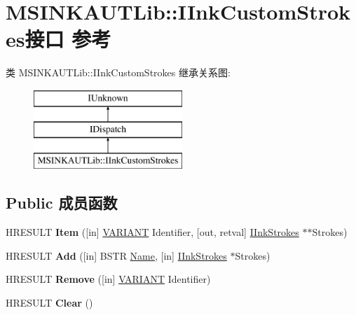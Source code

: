 \hypertarget{interface_m_s_i_n_k_a_u_t_lib_1_1_i_ink_custom_strokes}{}\section{M\+S\+I\+N\+K\+A\+U\+T\+Lib\+:\+:I\+Ink\+Custom\+Strokes接口 参考}
\label{interface_m_s_i_n_k_a_u_t_lib_1_1_i_ink_custom_strokes}
类 M\+S\+I\+N\+K\+A\+U\+T\+Lib\+:\+:I\+Ink\+Custom\+Strokes 继承关系图\+:\begin{figure}[H]
\begin{center}
\leavevmode
\includegraphics[height=3.000000cm]{interface_m_s_i_n_k_a_u_t_lib_1_1_i_ink_custom_strokes}
\end{center}
\end{figure}
\subsection*{Public 成员函数}
\begin{DoxyCompactItemize}
\item 
\mbox{\label{interface_m_s_i_n_k_a_u_t_lib_1_1_i_ink_custom_strokes_a1488da6f1ef4d523d1ede14031c46db4}} 
H\+R\+E\+S\+U\+LT {\bfseries Item} (\mbox{[}in\mbox{]} \hyperlink{structtag_v_a_r_i_a_n_t}{V\+A\+R\+I\+A\+NT} Identifier, \mbox{[}out, retval\mbox{]} \hyperlink{interface_m_s_i_n_k_a_u_t_lib_1_1_i_ink_strokes}{I\+Ink\+Strokes} $\ast$$\ast$Strokes)
\item 
\mbox{\label{interface_m_s_i_n_k_a_u_t_lib_1_1_i_ink_custom_strokes_a192985cb86ac9c9224cd9b4d3d7cfab7}} 
H\+R\+E\+S\+U\+LT {\bfseries Add} (\mbox{[}in\mbox{]} B\+S\+TR \hyperlink{struct_name_rec__}{Name}, \mbox{[}in\mbox{]} \hyperlink{interface_m_s_i_n_k_a_u_t_lib_1_1_i_ink_strokes}{I\+Ink\+Strokes} $\ast$Strokes)
\item 
\mbox{\label{interface_m_s_i_n_k_a_u_t_lib_1_1_i_ink_custom_strokes_ae35aa919119c542077a834851dd24609}} 
H\+R\+E\+S\+U\+LT {\bfseries Remove} (\mbox{[}in\mbox{]} \hyperlink{structtag_v_a_r_i_a_n_t}{V\+A\+R\+I\+A\+NT} Identifier)
\item 
\mbox{\label{interface_m_s_i_n_k_a_u_t_lib_1_1_i_ink_custom_strokes_af8dd3a8afb192c4136dac3b6ce41dd55}} 
H\+R\+E\+S\+U\+LT {\bfseries Clear} ()
\end{DoxyCompactItemize}

